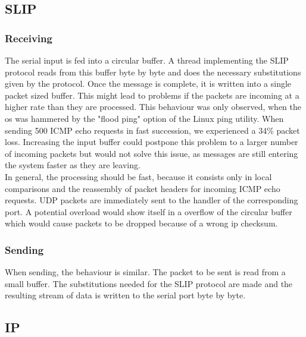 \subsection{SLIP}
\subsubsection{Receiving}
The serial input is fed into a circular buffer. A thread implementing the SLIP protocol reads from this buffer byte by byte and does the necessary substitutions given by the protocol. Once the message is complete, it is written into a single packet sized buffer. This might lead to problems if the packets are incoming at a higher rate than they are processed. This behaviour was only observed, when the os was hammered by the "flood ping" option of the Linux ping utility. When sending 500 ICMP echo requests in fast succession, we experienced a 34\% packet loss. Increasing the input buffer could postpone this problem to a larger number of incoming packets but would not solve this issue, as messages are still entering the system faster as they are leaving. \\
	In general, the processing should be fast, because it consists only in local comparisons and the reassembly of packet headers for incoming ICMP echo requests. UDP packets are immediately sent to the handler of the corresponding port. A potential overload would show itself in a overflow of the circular buffer which would cause packets to be dropped because of a wrong ip checksum.
\subsubsection{Sending}
When sending, the behaviour is similar. The packet to be sent is read from a small buffer. The substitutions needed for the SLIP protocol are made and the resulting stream of data is written to the serial port byte by byte.
\subsection{IP}
